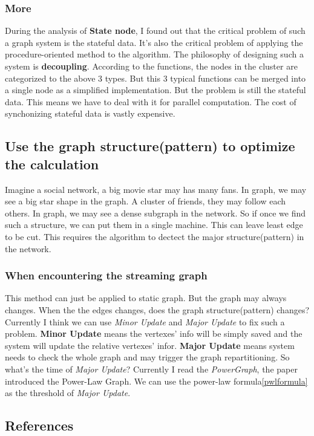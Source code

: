 \documentclass{article}
\begin{document}
	\subsubsection{More}
	During the analysis of \textbf{State node}, I found out that the critical problem of such a graph system is the stateful data. It's also the critical problem of applying the procedure-oriented method to the algorithm. The philosophy of designing such a system is \textbf{decoupling}. According to the functions, the nodes in the cluster are categorized to the above 3 types. But this 3 typical functions can be merged into a single node as a simplified implementation.
	\newline
	But the problem is still the stateful data. This means we have to deal with it for parallel computation. The cost of synchonizing stateful data is vastly expensive.

	\subsection{Use the graph structure(pattern) to optimize the calculation}
	Imagine a social network, a big movie star may has many fans. In graph, we may see a big star shape in the graph. A cluster of friends, they may follow each others. In graph, we may see a dense subgraph in the network. So if once we find such a structure, we can put them in a single machine. This can leave least edge to be cut.
	\newline
	This requires the algorithm to dectect the major structure(pattern) in the network.
	\subsubsection{When encountering the streaming graph}
	This method can just be applied to static graph. But the graph may always changes. When the the edges changes, does the graph structure(pattern) changes? Currently I think we can use \emph{Minor Update} and \emph{Major Update} to fix such a problem.
	\newline
	\textbf{Minor Update} means the vertexes' info will be simply saved and the system will update the relative vertexes' infor.
	\newline
	\textbf{Major Update} means system needs to check the whole graph and may trigger the graph repartitioning.
	\newline
	So what's the time of \emph{Major Update}? Currently I read the \emph{PowerGraph}, the paper introduced the Power-Law Graph. We can use the power-law formula\eqref{pwlformula} as the threshold of \emph{Major Update}.

	\newpage
	\begin{appendix}
		\section{References}
		
		
	\end{appendix}
\end{document}

